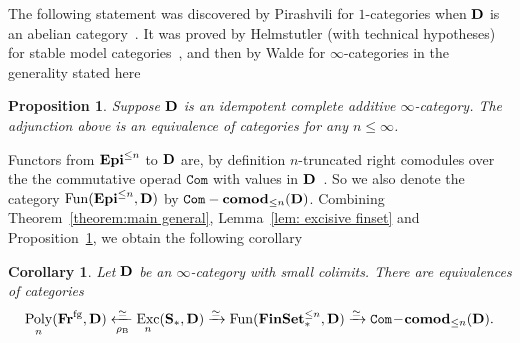 \documentclass[psamsfonts]{amsart}
\theoremstyle{plain}
\newtheorem{cor}[thm]{Corollary}
\newtheorem{prop}[thm]{Proposition}
\theoremstyle{definition}
\theoremstyle{remark}
\newcommand{\Q}{\mathbb{Q}}
\newcommand{\catname}[1]{{\normalfont\textbf{#1}}}
\newcommand{\op}{{\mathrm{op}}}
\newcommand{\finset}{\catname{FinSet}_*}
\newcommand{\epi}{\catname{Epi}}
\newcommand{\spaces}{\catname{S}_*}
\newcommand{\fr}{\allfr^{\mathrm{fg}}}
\newcommand{\allfr}{\catname{Fr}}
\newcommand{\ch}{\catname{Ch}}
\newcommand{\comod}{\catname{comod}}
\newcommand{\com}{\mathtt{Com}}
\newcommand{\Lie}{\mathtt{Lie}}
\newcommand{\classifying}{\operatorname{B}}
\DeclareMathOperator{\fun}{Fun}
\DeclareMathOperator{\poly}{Poly}
\DeclareMathOperator{\exc}{Exc}
\begin{document}
The following statement was discovered by Pirashvili for $1$-categories when $\catname{D}$ is an abelian category~\cite{PirashviliDK}. It was proved by Helmstutler (with technical hypotheses) for stable model categories~\cite{Helmstutler}, and then by Walde for  $\infty$-categories in the generality stated here~\cite[Section 4.2]{Walde}
\begin{prop}\label{prop:Pirashvili-Helmstutler-Walde}
Suppose $\catname{D}$ is an idempotent complete additive $\infty$-category. The adjunction above is an equivalence of categories for any $n\le \infty$. 
\end{prop}
Functors from $\epi^{\le n}$ to $\catname{D}$ are, by definition $n$-truncated right comodules over the the commutative operad $\com$ with values in $\catname{D}$~\cite{Arone-Ching_Cross-effects}. So we also denote the category $\fun(\epi^{\le n}, \catname{D})$ by $\com-\comod_{\le n}(\catname{D})$. Combining Theorem~\ref{theorem:main general}, Lemma~\ref{lem: excisive finset} and Proposition~\ref{prop:Pirashvili-Helmstutler-Walde}, we obtain the  following corollary
\begin{cor}\label{cor:com comodule main}
Let $\catname{D}$ be an $\infty$-category with small colimits. There are equivalences of categories
\[
\poly_n(\fr, \catname{D})\xleftarrow[\rho_{\classifying}]{\simeq} \exc_n(\spaces, \catname{D}) \xrightarrow{\simeq} \fun(\finset^{\le n}, \catname{D}) \xrightarrow{\simeq}\com\!-\!\comod_{\le n}(\catname{D}).
\]
\end{cor}
\end{document}
